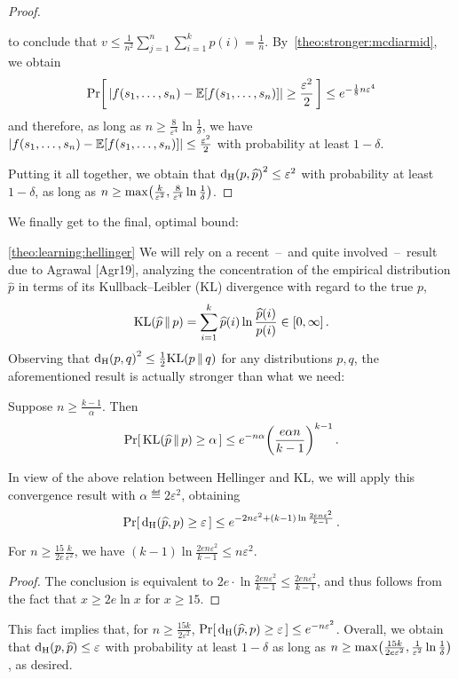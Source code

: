 \documentclass[10pt]{article}
\newcommand{\dst}{\varepsilon}
\newcommand{\ab}{k}
\newcommand{\ns}{n}
\begin{document}
\begin{proof}
\begin{itemize}
\[      \]
      to conclude that $v \leq \frac{1}{\ns^2} \sum_{j=1}^\ns \sum_{i=1}^\ab p(i)  = \frac{1}{\ns}$. By~\autoref{theo:stronger:mcdiarmid}, we obtain
      \[
          \probaOf{ \abs{f(s_1,\dots,s_\ns)-\expect{f(s_1,\dots,s_\ns)}} \geq \frac{\dst^2}{2} } \leq e^{-\frac{1}{8}\ns\dst^4}
      \]
      and therefore, as long as $\ns \geq \frac{8}{\dst^4}\ln\frac{1}{\delta}$, we have $\abs{f(s_1,\dots,s_\ns)-\expect{f(s_1,\dots,s_\ns)}} \leq \frac{\dst^2}{2}$ with probability at least $1-\delta$.
    \end{itemize}
    Putting it all together, we obtain that $\hellinger{p}{\widehat{p}}^2 \leq \dst^2$ with probability at least $1-\delta$, as long as $\ns \geq \max\mleft( \frac{\ab}{\dst^2}, \frac{8}{\dst^4}\ln\frac{1}{\delta}\mright)$.
\end{proof}
\noindent We finally get to the final, optimal bound:
\begin{proofof}{\autoref{theo:learning:hellinger}}
We will rely on a recent~--~and quite involved~--~result due to Agrawal [Agr19], analyzing the concentration of the empirical distribution $\widehat{p}$ in terms of its Kullback--Leibler (KL) divergence with regard to the true $p$,
\[
    \kldiv{\widehat{p}}{p} = \sum_{i=1}^\ab \widehat{p}(i) \ln \frac{\widehat{p}(i)}{p(i)} \in[0,\infty]\,.
\]
Observing that $\hellinger{p}{q}^2 \leq \frac{1}{2} \kldiv{p}{q}$ for any distributions $p, q$, the aforementioned result is actually stronger than what we need:
\begin{theorem}
  Suppose $\ns \geq \frac{\ab-1}{\alpha}$. Then
  \[
      \probaOf{ \kldiv{\widehat{p}}{p} \geq \alpha } \leq e^{-\ns\alpha}\mleft(\frac{e\alpha\ns}{\ab-1}\mright)^{\ab-1}\,.
  \]
\end{theorem}
\noindent In view of the above relation between Hellinger and KL, we will apply this convergence result with $\alpha \eqdef 2\dst^2$, obtaining
  \[
      \probaOf{ \hellinger{\widehat{p}}{p} \geq \dst } \leq e^{-2\ns\dst^2 + (\ab-1)\ln\frac{2e\ns\dst^2}{\ab-1}}\,.
  \]
  \begin{fact}
      For $\ns \geq \frac{15}{2e}\frac{\ab}{\dst^2}$, we have $(\ab-1)\ln\frac{2e\ns\dst^2}{\ab-1}\leq \ns\dst^2$. 
  \end{fact}
  \begin{proof}
  The conclusion is equivalent to $2e\cdot\ln\frac{2e\ns\dst^2}{\ab-1}\leq \frac{2e\ns\dst^2}{\ab-1}$, and thus follows from the fact that $x\geq 2e \ln x$ for $x\geq 15$.
  \end{proof}
  \noindent This fact implies that, for $\ns \geq \frac{15\ab}{2\dst^2}$, $\probaOf{ \hellinger{\widehat{p}}{p} \geq \dst } \leq e^{-\ns\dst^2}$. Overall, we obtain that $\hellinger{p}{\widehat{p}} \leq \dst$ with probability at least $1-\delta$ as long as $\ns \geq \max\mleft( \frac{15\ab}{2e\dst^2}, \frac{1}{\dst^2}\ln\frac{1}{\delta}\mright)$, as desired.
\end{proofof}
\end{document}
